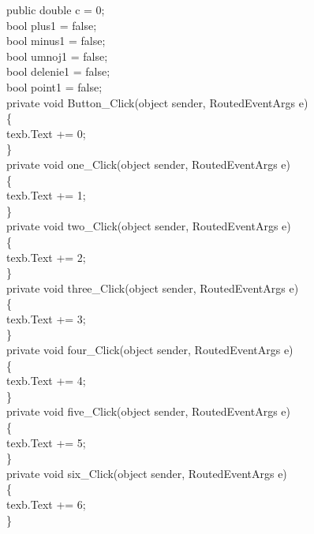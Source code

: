         public double c = 0;\\
        bool plus1 = false;\\
        bool minus1 = false;\\
        bool umnoj1 = false;\\
        bool delenie1 = false;\\
        bool point1 = false;\\

        private void Button\_Click(object sender, RoutedEventArgs e)\\
        \{\\
            texb.Text += 0;\\
        \}\\

        private void one\_Click(object sender, RoutedEventArgs e)\\
        \{\\
            texb.Text += 1;\\
        \}\\

        private void two\_Click(object sender, RoutedEventArgs e)\\
        \{\\
            texb.Text += 2;\\
        \}\\

        private void three\_Click(object sender, RoutedEventArgs e)\\
        \{\\
            texb.Text += 3;\\
        \}\\

        private void four\_Click(object sender, RoutedEventArgs e)\\
        \{\\
            texb.Text += 4;\\
        \}\\

        private void five\_Click(object sender, RoutedEventArgs e)\\
        \{\\
            texb.Text += 5;\\
        \}\\

        private void six\_Click(object sender, RoutedEventArgs e)\\
        \{\\
            texb.Text += 6;\\
        \}\\


